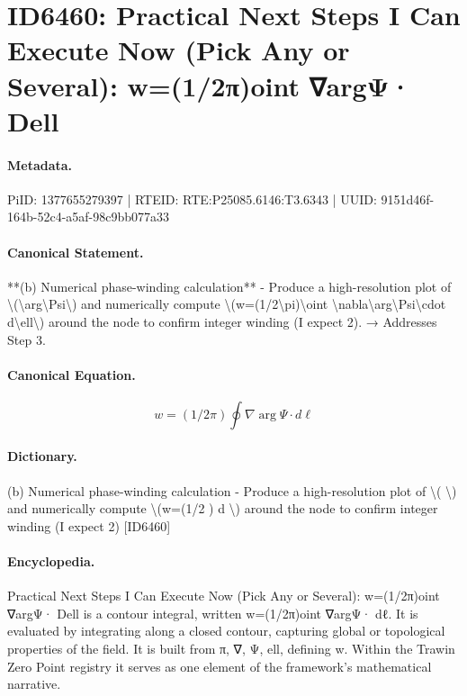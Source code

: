\section*{ID6460: Practical Next Steps I Can Execute Now (Pick Any or Several): w=(1/2π)oint ∇argΨ· Dell}
\paragraph{Metadata.}
PiID: 1377655279397 | RTEID: RTE:P25085.6146:T3.6343 | UUID: 9151d46f-164b-52c4-a5af-98c9bb077a33

\paragraph{Canonical Statement.}
**(b) Numerical phase-winding calculation** - Produce a high-resolution plot of \textbackslash{}(\textbackslash{}arg\textbackslash{}Psi\textbackslash{}) and numerically compute \textbackslash{}(w=(1/2\textbackslash{}pi)\textbackslash{}oint \textbackslash{}nabla\textbackslash{}arg\textbackslash{}Psi\textbackslash{}cdot d\textbackslash{}ell\textbackslash{}) around the node to confirm integer winding (I expect 2). → Addresses Step 3.

\paragraph{Canonical Equation.}
\[
w=(1/2\pi)\oint \nabla\arg\Psi\cdot d\ell
\]

\paragraph{Dictionary.}
(b) Numerical phase-winding calculation - Produce a high-resolution plot of \textbackslash{}( \textbackslash{}) and numerically compute \textbackslash{}(w=(1/2 ) d \textbackslash{}) around the node to confirm integer winding (I expect 2) [ID6460]

\paragraph{Encyclopedia.}
Practical Next Steps I Can Execute Now (Pick Any or Several): w=(1/2π)oint ∇argΨ· Dell is a contour integral, written w=(1/2π)oint ∇argΨ· dℓ. It is evaluated by integrating along a closed contour, capturing global or topological properties of the field. It is built from π, ∇, Ψ, ell, defining w. Within the Trawin Zero Point registry it serves as one element of the framework's mathematical narrative.
